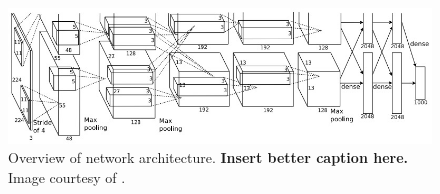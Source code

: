 \begin{figure}[htbp]
  \centering
  \includegraphics[width=\linewidth]{../images/architecture.jpg}
  \caption[]
  {\small
    Overview of network architecture. \textbf{Insert better caption here.} Image courtesy of \cite{NIPS2012_4824}.
  }
  \label{fig:architecture}
\end{figure}
